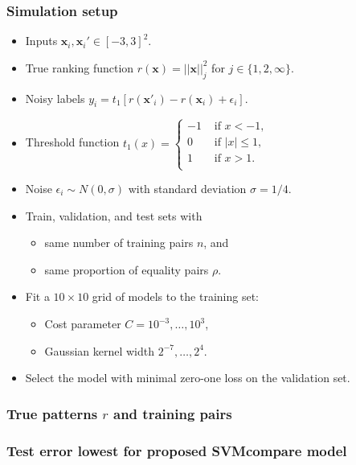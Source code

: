 \documentclass{beamer}
\begin{document}
\begin{frame}
  \frametitle{Simulation setup}
  \begin{itemize}
    \item Inputs $\mathbf x_i,\mathbf x_i'\in[-3,3]^2$.
    \item True ranking function $r(\mathbf x)=||\mathbf x||^2_j$ 
      for $j\in\{1,2,\infty\}$.
    \item Noisy labels $y_i=t_1[r(\mathbf x'_i)-r(\mathbf x_i)+\epsilon_i]$.
  \item Threshold function
$
  \label{eq:threshold}
  t_1(x) = 
  \begin{cases}
    -1 & \text{ if } x < -1, \\
    0 & \text{ if } |x| \leq 1, \\
    1 & \text{ if } x > 1. \\
  \end{cases}
$
\item Noise $\epsilon_i\sim N(0, \sigma)$ with standard deviation
  $\sigma=1/4$.
\item Train, validation, and test sets with
  \begin{itemize}
    \item same number of training pairs $n$, and
    \item same proportion of equality pairs $\rho$.
  \end{itemize}
\item Fit a $10\times 10$ grid of models to the training
set:
\begin{itemize}
\item Cost parameter $C=10^{-3},\dots,10^3$,
\item Gaussian kernel width $2^{-7},\dots,2^4$.
\end{itemize}
\item Select the model with minimal zero-one loss on the validation set.
  \end{itemize}
\end{frame}

\begin{frame}
  \frametitle{True patterns $r$ and training pairs}
  
\end{frame}



\begin{frame}
  \frametitle{Test error lowest for proposed SVMcompare model}
  \begin{minipage}{1.0\linewidth}
    \hskip -0.5cm
      
  \end{minipage}
\end{frame}
\end{document}
